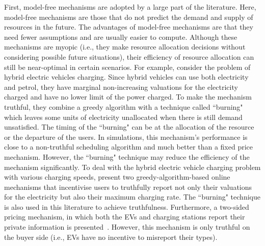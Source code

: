 \documentclass[11pt]{phdthesis}
\begin{document}

First, model-free mechanisms are adopted by a large part of the literature. Here, model-free mechanisms are those that do not predict the demand and supply of resources in the future. The advantages of model-free mechanisms are that they need fewer assumptions and are usually easier to compute. Although these mechanisms are myopic (i.e., they make resource allocation decisions without considering possible future situations), their efficiency of resource allocation can still be near-optimal in certain scenarios. For example,
\citet{gerding2011online} consider the problem of hybrid electric vehicles charging. Since hybrid vehicles can use both electricity and petrol, they have marginal non-increasing valuations for the electricity charged and have no lower limit of the power charged. To make the mechanism truthful, they combine a greedy algorithm with a technique called ``burning" which leaves some units of electricity unallocated when there is still demand unsatisfied. The timing of the ``burning" can be at the allocation of the resource or the departure of the users. In simulations, this mechanism's performance is close to a non-truthful scheduling algorithm and much better than a fixed price mechanism. However, the ``burning" technique may reduce the efficiency of the mechanism significantly. To deal with the hybrid electric vehicle charging problem with various charging speeds, \citet{robu2011online} present two greedy-algorithm-based online mechanisms that incentivise users to truthfully report not only their valuations for the electricity but also their maximum charging rate. The ``burning" technique is also used in this literature to achieve truthfulness. Furthermore, a two-sided pricing mechanism, in which both the EVs and charging stations report their private information is presented~\citep{gerding2013two}. However, this mechanism is only truthful on the buyer side (i.e., EVs have no incentive to misreport their types). 
\end{document}
